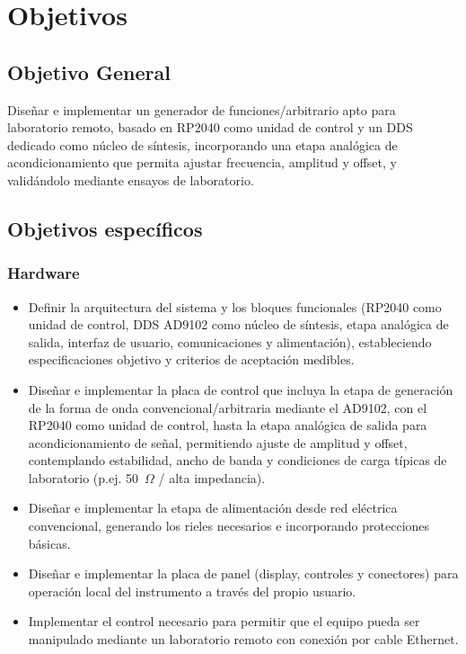 \section{Objetivos}

\subsection{Objetivo General}
Diseñar e implementar un generador de funciones/arbitrario apto para laboratorio remoto, basado en RP2040 como unidad de control y un DDS dedicado como núcleo de síntesis, incorporando una etapa analógica de acondicionamiento que permita ajustar frecuencia, amplitud y offset, y validándolo mediante ensayos de laboratorio.

\subsection{Objetivos específicos}

\subsubsection{Hardware}
\begin{itemize}
	\item Definir la arquitectura del sistema y los bloques funcionales (RP2040 como unidad de control, DDS AD9102 como núcleo de síntesis, etapa analógica de salida, interfaz de usuario, comunicaciones y alimentación), estableciendo especificaciones objetivo y criterios de aceptación medibles.
	\item Diseñar e implementar la placa de control que incluya la etapa de generación de la forma de onda convencional/arbitraria mediante el AD9102, con el RP2040 como unidad de control, hasta la etapa analógica de salida para acondicionamiento de señal, permitiendo ajuste de amplitud y offset, contemplando estabilidad, ancho de banda y condiciones de carga típicas de laboratorio (p.ej. 50~\(\Omega\) / alta impedancia).
	\item Diseñar e implementar la etapa de alimentación desde red eléctrica convencional, generando los rieles necesarios e incorporando protecciones básicas.
	\item Diseñar e implementar la placa de panel (display, controles y conectores) para operación local del instrumento a través del propio usuario.
	\item Implementar el control necesario para permitir que el equipo pueda ser manipulado mediante un laboratorio remoto con conexión por cable Ethernet.
\end{itemize}

